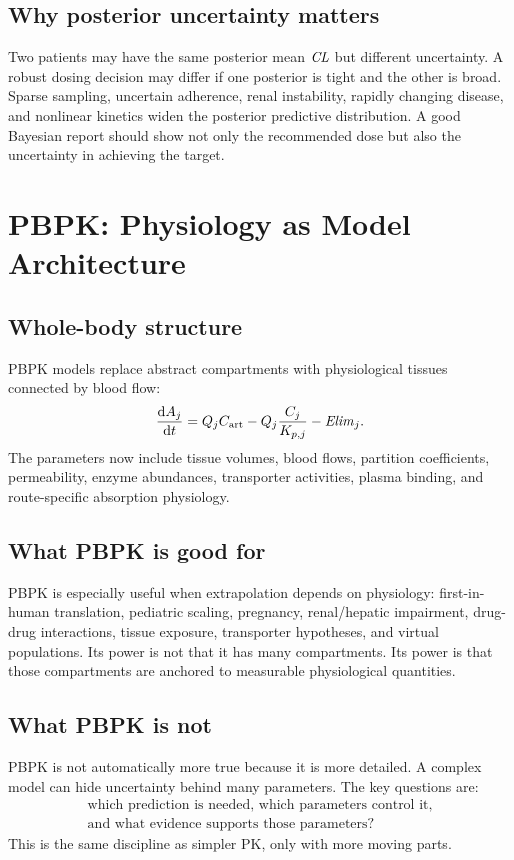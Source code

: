 \documentclass[a4paper]{article}
\newcommand{\pkCL}{\pksym{CL}}
\begin{document}
\subsection{Why posterior uncertainty matters}

Two patients may have the same posterior mean \(\pkCL\) but different uncertainty. A robust dosing decision may differ if one posterior is tight and the other is broad. Sparse sampling, uncertain adherence, renal instability, rapidly changing disease, and nonlinear kinetics widen the posterior predictive distribution. A good Bayesian report should show not only the recommended dose but also the uncertainty in achieving the target.

\section{PBPK: Physiology as Model Architecture}

\subsection{Whole-body structure}

PBPK models replace abstract compartments with physiological tissues connected by blood flow:
\[
  \frac{\dd A_j}{\dd t}
  =
  Q_j C_{\pklab{art}}
  -
  Q_j\frac{C_j}{K_{p,j}}
  -
  \pksym{Elim}_j.
\]
The parameters now include tissue volumes, blood flows, partition coefficients, permeability, enzyme abundances, transporter activities, plasma binding, and route-specific absorption physiology.

\figurePBPK

\subsection{What PBPK is good for}

PBPK is especially useful when extrapolation depends on physiology: first-in-human translation, pediatric scaling, pregnancy, renal/hepatic impairment, drug-drug interactions, tissue exposure, transporter hypotheses, and virtual populations. Its power is not that it has many compartments. Its power is that those compartments are anchored to measurable physiological quantities.

\subsection{What PBPK is not}

PBPK is not automatically more true because it is more detailed. A complex model can hide uncertainty behind many parameters. The key questions are:
\[
  \begin{gathered}
  \text{which prediction is needed, which parameters control it,}\\
  \text{and what evidence supports those parameters?}
  \end{gathered}
\]
This is the same discipline as simpler PK, only with more moving parts.
\end{document}
